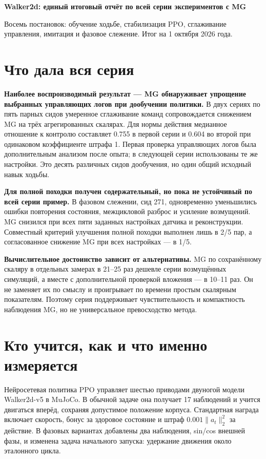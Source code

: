 \documentclass[10pt,a4paper]{article}
\begin{document}
{\Large\bfseries Walker2d: единый итоговый отчёт по всей серии экспериментов с MG}\par\medskip

Восемь постановок: обучение ходьбе, стабилизация PPO, сглаживание управления, имитация и фазовое слежение. Итог на 1 октября 2026 года.

\section*{Что дала вся серия}

\textbf{Наиболее воспроизводимый результат --- MG обнаруживает упрощение выбранных управляющих логов при дообучении политики.} В двух сериях по пять парных сидов умеренное сглаживание команд сопровождается снижением MG на трёх агрегированных скалярах. Для нормы действия медианное отношение к контролю составляет 0.755 в первой серии и 0.604 во второй при одинаковом коэффициенте штрафа 1. Первая проверка управляющих логов была дополнительным анализом после опыта; в следующей серии использованы те же настройки. Это десять различных сидов дообучения, но один общий исходный навык ходьбы.

\textbf{Для полной походки получен содержательный, но пока не устойчивый по всей серии пример.} В фазовом слежении, сид 271, одновременно уменьшились ошибки повторения состояния, межцикловой разброс и усиление возмущений. MG снизился при всех пяти заданных настройках датчика и реконструкции. Совместный критерий улучшения полной походки выполнен лишь в 2/5 пар, а согласованное снижение MG при всех настройках --- в 1/5.

\textbf{Вычислительное достоинство зависит от альтернативы.} MG по сохранённому скаляру в отдельных замерах в 21--25 раз дешевле серии возмущённых симуляций, а вместе с дополнительной проверкой вложения --- в 10--11 раз. Он не заменяет их по смыслу и проигрывает по времени простым скалярным показателям. Поэтому серия поддерживает чувствительность и компактность наблюдения MG, но не универсальное превосходство метода.

\section*{Кто учится, как и что именно измеряется}

Нейросетевая политика PPO управляет шестью приводами двуногой модели Walker2d-v5 в MuJoCo. В обычной задаче она получает 17 наблюдений и учится двигаться вперёд, сохраняя допустимое положение корпуса. Стандартная награда включает скорость, бонус за здоровое состояние и штраф $0.001\|a_t\|_2^2$ за действие. В фазовых вариантах добавлены два наблюдения, sin/cos внешней фазы, и изменена задача начального запуска: удержание движения около эталонного цикла.
\end{document}
